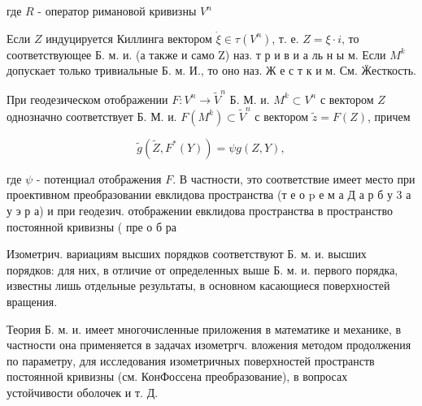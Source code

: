 \documentclass[10pt]{article}
\begin{document}
где $R$ - оператор римановой кривизны $V^{n}$



Если $Z$ индуцируется Киллинга вектором $\dot{\xi} \in \tau\left(V^{n}\right)$, т. е. $Z=\xi \cdot i$, то соответствующее Б. м. и. (а также и само Z) наз. т р и в и а ль н ы м. Если $M^{k}$ допускает только тривиальные Б. м. И., то оно наз. Ж е с т к и м. См. Ӝесткость.



При геодезическом отображении $F: V^{n} \rightarrow \tilde{V}^{n}$ Б. М. и. $M^{k} \subset V^{n}$ с вектором $Z$ однозначно соответствует Б. М. и. $F\left(M^{k}\right) \subset \tilde{V}^{n}$ с вектором $\tilde{z}=F(Z)$, причем



\[

\tilde{g}\left(\tilde{Z}, F^{*}(Y)\right)=\psi g(Z, Y),

\]



где $\psi$ - потенциал отображения $F$. В частности, это соответствие имеет место при проективном преобразовании евклидова пространства (т е о p е м а Д а р б у 3 а у э р а) и при геодезич. отображении евклидова пространства в пространство постоянной кривизны ( пре о б ра



Изометрич. вариациям высших порядков соответствуют Б. м. и. высших порядков: для них, в отличие от определенных выше Б. м. и. первого порядка, известны лишь отдельные результаты, в основном касающиеся поверхностей вращения.



Теория Б. м. и. имеет многочисленные приложения в математике и механике, в частности она применяется в задачах изометргч. вложения методом продолжения по параметру, для исследования изометричных поверхностей пространств постоянной кривизны (см. КонФоссена преобразование), в вопросах устойчивости оболочек и т. Д.
\end{document}
